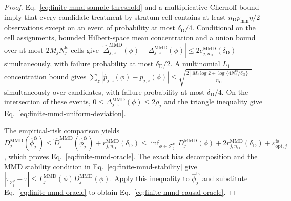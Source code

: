 \begin{proof}
Eq.~\eqref{eq:finite-mmd-sample-threshold} and a multiplicative Chernoff bound imply that every candidate treatment-by-stratum cell contains at least $n_{\mathrm D}p_{\min}\eta/2$ observations except on an event of probability at most $\delta_{\mathrm D}/4$. Conditional on the cell assignments, bounded Hilbert-space mean concentration and a union bound over at most $2M_jN_j^{\mathrm{fs}}$ cells give
\(\left| \widehat\Delta_{j,z}^{\mathrm{MMD}}(\phi) -\Delta_{j,z}^{\mathrm{MMD}}(\phi) \right| \le 2e_{j,n_{\mathrm D}}^{\mathrm{MMD}}(\delta_{\mathrm D})\)
simultaneously, with failure probability at most $\delta_{\mathrm D}/2$. A multinomial $L_1$ concentration bound gives
\(\sum_z|\widehat p_{j,z}(\phi)-p_{j,z}(\phi)| \le \sqrt{ \frac{ 2\left[M_j\log2+\log\{4N_j^{\mathrm{fs}}/\delta_{\mathrm D}\}\right] }{n_{\mathrm D}} }\)
simultaneously over candidates, with failure probability at most $\delta_{\mathrm D}/4$. On the intersection of these events, $0\le\Delta_{j,z}^{\mathrm{MMD}}(\phi)\le2\rho_j$ and the triangle inequality give Eq.~\eqref{eq:finite-mmd-uniform-deviation}.

The empirical-risk comparison yields
\(D_j^{\mathrm{MMD}}(\widehat\phi_j^{\mathrm{fs}}) \le \widehat D_j^{\mathrm{MMD}}(\widehat\phi_j^{\mathrm{fs}}) +r_{j,n_{\mathrm D}}^{\mathrm{MMD}}(\delta_{\mathrm D}) \le \inf_{\phi\in\mathcal F_j^{\mathrm{fs}}} D_j^{\mathrm{MMD}}(\phi) +2r_{j,n_{\mathrm D}}^{\mathrm{MMD}}(\delta_{\mathrm D}) +\varepsilon_{\mathrm{opt},j}^{\mathrm{fs}}\),
which proves Eq.~\eqref{eq:finite-mmd-oracle}. The exact bias decomposition and the MMD stability condition in Eq.~\eqref{eq:finite-mmd-stability} give
\(|\tau_{Z_j^\phi}-\tau| \le \Gamma_j^{\mathrm{MMD}}(\phi)D_j^{\mathrm{MMD}}(\phi).\)
Apply this inequality to $\widehat\phi_j^{\mathrm{fs}}$ and substitute Eq.~\eqref{eq:finite-mmd-oracle} to obtain Eq.~\eqref{eq:finite-mmd-causal-oracle}.
\end{proof}
